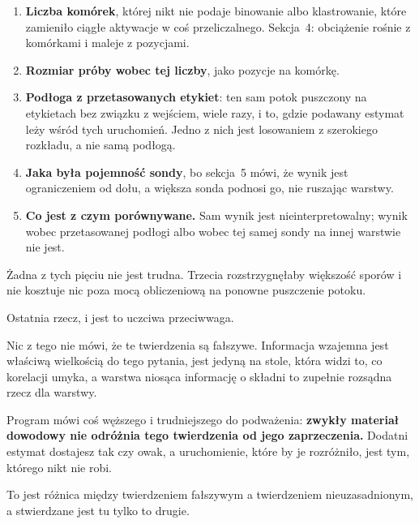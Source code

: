 \begin{fr}
\begin{ansblock}
\begin{enumerate}
\item \textbf{Liczba komórek}, której nikt nie podaje \dash{} binowanie albo
  klastrowanie, które zamieniło ciągłe aktywacje w coś przeliczalnego.
  Sekcja~4: obciążenie rośnie z komórkami i maleje z pozycjami.
\item \textbf{Rozmiar próby wobec tej liczby}, jako pozycje na komórkę.
\item \textbf{Podłoga z przetasowanych etykiet}: ten sam potok puszczony na
  etykietach bez związku z wejściem, wiele razy, i to, gdzie podawany estymat
  leży wśród tych uruchomień. Jedno z nich jest losowaniem z szerokiego
  rozkładu, a nie samą podłogą.
\item \textbf{Jaka była pojemność sondy}, bo sekcja~5 mówi, że wynik jest
  ograniczeniem od dołu, a większa sonda podnosi go, nie ruszając warstwy.
\item \textbf{Co jest z czym porównywane.} Sam wynik jest nieinterpretowalny;
  wynik wobec przetasowanej podłogi albo wobec tej samej sondy na innej
  warstwie \dash{} nie jest.
\end{enumerate}
\end{ansblock}

Żadna z tych pięciu nie jest trudna. Trzecia rozstrzygnęłaby większość
sporów i nie kosztuje nic poza mocą obliczeniową na ponowne puszczenie
potoku.
\end{fr}

\begin{fr}
Ostatnia rzecz, i jest to uczciwa przeciwwaga.

Nic z tego nie mówi, że te twierdzenia są fałszywe. Informacja wzajemna jest
właściwą wielkością do tego pytania, jest jedyną na stole, która widzi to, co
korelacji umyka, a warstwa niosąca informację o składni to zupełnie rozsądna
rzecz dla warstwy.

Program mówi coś węższego i trudniejszego do podważenia: \textbf{zwykły
materiał dowodowy nie odróżnia tego twierdzenia od jego zaprzeczenia.}
Dodatni estymat dostajesz tak czy owak, a uruchomienie, które by je
rozróżniło, jest tym, którego nikt nie robi.

To jest różnica między twierdzeniem fałszywym a twierdzeniem
nieuzasadnionym, a stwierdzane jest tu tylko to drugie.
\end{fr}


